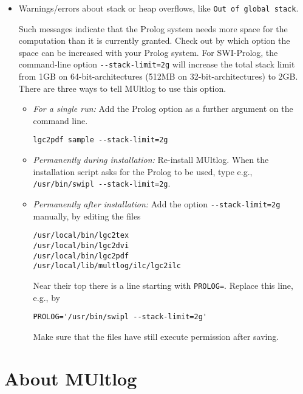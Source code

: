 \documentclass[]{article}
\begin{document}
\begin{itemize}
\item
  Warnings/errors about stack or heap overflows, like
  \texttt{Out\ of\ global\ stack}.

  Such messages indicate that the Prolog system needs more space for the
  computation than it is currently granted. Check out by which option
  the space can be increased with your Prolog system. For SWI-Prolog,
  the command-line option \texttt{-\/-stack-limit=2g} will increase the
  total stack limit from 1GB on 64-bit-architectures (512MB on
  32-bit-architectures) to 2GB. There are three ways to tell MUltlog to
  use this option.

  \begin{itemize}
  \item
    \emph{For a single run:} Add the Prolog option as a further argument
    on the command line.

\begin{verbatim}
lgc2pdf sample --stack-limit=2g
\end{verbatim}
  \item
    \emph{Permanently during installation:} Re-install MUltlog. When the
    installation script asks for the Prolog to be used, type e.g.,
    \texttt{/usr/bin/swipl\ -\/-stack-limit=2g}.
  \item
    \emph{Permanently after installation:} Add the option
    \texttt{-\/-stack-limit=2g} manually, by editing the files

\begin{verbatim}
/usr/local/bin/lgc2tex
/usr/local/bin/lgc2dvi
/usr/local/bin/lgc2pdf
/usr/local/lib/multlog/ilc/lgc2ilc
\end{verbatim}

    Near their top there is a line starting with \texttt{PROLOG=}.
    Replace this line, e.g., by

\begin{verbatim}
PROLOG='/usr/bin/swipl --stack-limit=2g'
\end{verbatim}

    Make sure that the files have still execute permission after saving.
  \end{itemize}
\end{itemize}

\hypertarget{about-multlog}{%
\section{About MUltlog}\label{about-multlog}}
\end{document}
